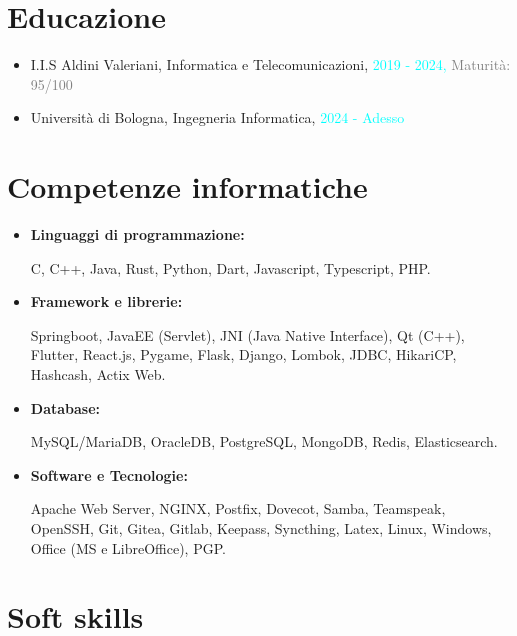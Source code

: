 \documentclass{paper}
\begin{document}
\section{Educazione}

\begin{itemize}
    \item I.I.S Aldini Valeriani,
    Informatica e Telecomunicazioni,
    \textcolor{cyan}{2019 - 2024,}
    \textcolor{gray}{Maturità: 95/100}

    \item Università di Bologna,
    Ingegneria Informatica,
    \textcolor{cyan}{2024 - Adesso}
\end{itemize}

\section{Competenze informatiche}

\begin{itemize}
    \item \textbf{Linguaggi di programmazione:}
    
    C, C++, Java, Rust, Python, Dart, Javascript,
    Typescript, PHP.

    \item \textbf{Framework e librerie:}
    
    Springboot, JavaEE (Servlet),
    JNI (Java Native Interface), Qt (C++), Flutter,
    React.js, Pygame, Flask, Django, Lombok, JDBC,
    HikariCP, Hashcash, Actix Web.

    \item \textbf{Database:}
    
    MySQL/MariaDB, OracleDB, PostgreSQL, MongoDB, Redis, Elasticsearch.

    \item \textbf{Software e Tecnologie:}
    
    Apache Web Server, NGINX, Postfix, Dovecot, Samba,
    Teamspeak, OpenSSH, Git, Gitea, Gitlab, Keepass,
    Syncthing, Latex, Linux, Windows, Office (MS e LibreOffice), PGP.
\end{itemize}

\section{Soft skills}
\end{document}
